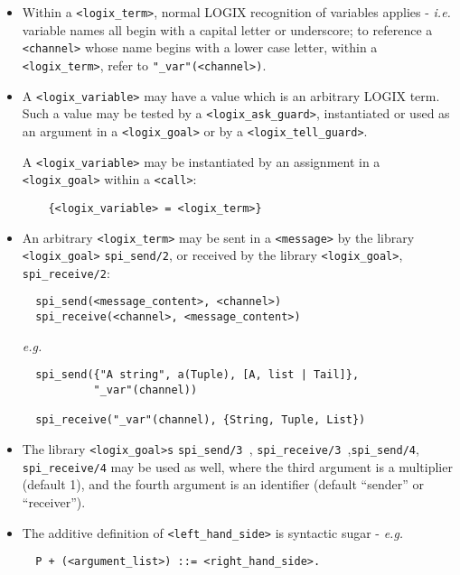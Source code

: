 \begin{itemize}
\item
Within a \verb+<logix_term>+, normal LOGIX recognition of variables
applies - {\em i.e.} variable names all begin with a capital letter
or underscore; to reference a \verb+<channel>+ whose name begins
with a lower case letter, within a \verb+<logix_term>+, refer to
\verb+"_var"(<channel>)+.


\item
A \verb+<logix_variable>+ may have a value which is an arbitrary LOGIX
term.
Such a value may be tested by a \verb+<logix_ask_guard>+,
instantiated or used as an argument in a \verb+<logix_goal>+ or by
a \verb+<logix_tell_guard>+.

\noindent
A \verb+<logix_variable>+ may be instantiated by an assignment
in a \verb+<logix_goal>+ within a \verb+<call>+:

\begin{verbatim}
    {<logix_variable> = <logix_term>}
\end{verbatim}

\item An
arbitrary  \verb+<logix_term>+ may be sent in a \verb+<message>+ by
the library \verb+<logix_goal>+ \verb+spi_send/2+, or received by the
library \verb+<logix_goal>+, \verb+spi_receive/2+:

\begin{verbatim}
  spi_send(<message_content>, <channel>)
  spi_receive(<channel>, <message_content>)
\end{verbatim}

\newpage
\noindent
{\em e.g.}

\begin{verbatim}
  spi_send({"A string", a(Tuple), [A, list | Tail]},
           "_var"(channel))

  spi_receive("_var"(channel), {String, Tuple, List})
\end{verbatim}

\item
The library \verb+<logix_goal>s+ \verb+spi_send/3 +,
\verb+spi_receive/3 +,\linebreak \verb+spi_send/4+, \verb+spi_receive/4+ may be
used as well, where the third argument is a multiplier (default 1), and
the fourth argument is an identifier (default ``sender'' or ``receiver'').

\item
The additive definition of \verb+<left_hand_side>+ is syntactic sugar
- {\em e.g.}

\begin{verbatim}
  P + (<argument_list>) ::= <right_hand_side>.
\end{verbatim}


\end{itemize}
